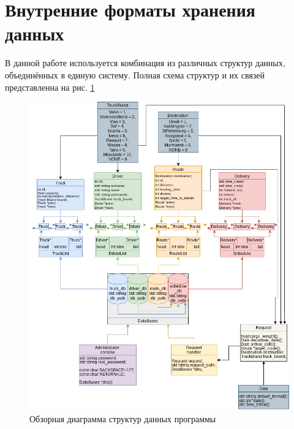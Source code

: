 \section{Внутренние форматы хранения данных}
\setcounter{figure}{0}


В данной работе используется комбинация из различных структур данных, 
объединённых в единую систему.
Полная схема структур и их связей представленна на рис. \ref{overall_data_structure} 

\begin{figure}[hpt!]
    \centering
    \includegraphics[width=1\linewidth]{photo/data_structures/overall_data_structure}
    \caption{Обзорная диаграмма структур данных программы}
    \label{overall_data_structure}
\end{figure}

\newpage

